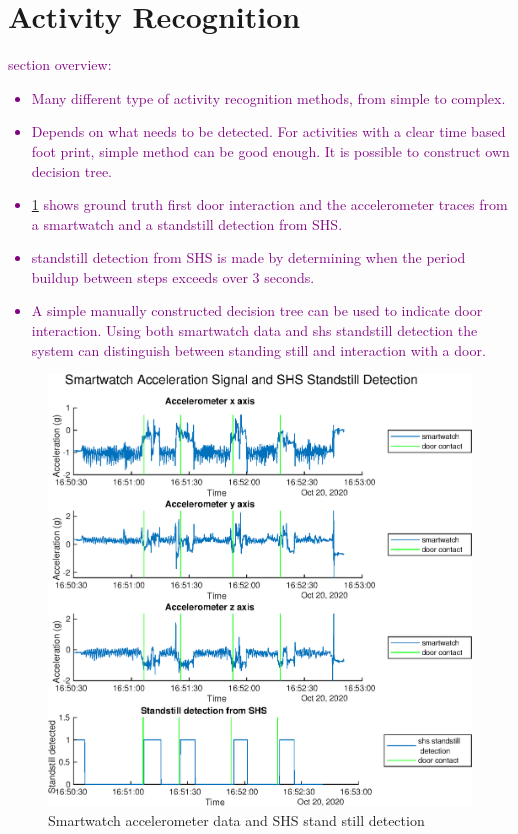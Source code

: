 \section{Activity Recognition}
\label{sec:method-AR}

\textcolor{purple}{ section overview:
\begin{itemize}
	\item Many different type of activity recognition methods, from simple to complex. 
	\item Depends on what needs to be detected. For activities with a clear time based foot print, simple method can be good enough. It is possible to construct own decision tree.
	\item \cref{fig:stand_still_detection_from_shs} shows ground truth first door interaction and the accelerometer traces from a smartwatch and a standstill detection from SHS.
	\item standstill detection from SHS is made by determining when the period buildup between steps exceeds over 3 seconds.
	\item A simple manually constructed decision tree can be used to indicate door interaction. Using both smartwatch data and shs standstill detection the system can distinguish between standing still and interaction with a door.  
\end{itemize}}

\begin{figure}[H]
	\centering
	\includegraphics[width=0.7\linewidth]{images/20201103_1325_Standstill_detection_from_SHS}
	\caption{Smartwatch accelerometer data and SHS stand still detection}
	\label{fig:stand_still_detection_from_shs}
\end{figure}

